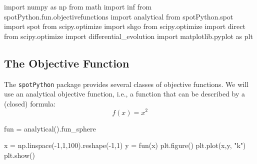 \documentclass[
  letterpaper,
  DIV=11,
  numbers=noendperiod]{scrreprt}
\newenvironment{Shaded}{\begin{snugshade}}{\end{snugshade}}
\newcommand{\DecValTok}[1]{\textcolor[rgb]{0.68,0.00,0.00}{#1}}
\newcommand{\ImportTok}[1]{\textcolor[rgb]{0.00,0.46,0.62}{#1}}
\newcommand{\NormalTok}[1]{\textcolor[rgb]{0.00,0.23,0.31}{#1}}
\newcommand{\OperatorTok}[1]{\textcolor[rgb]{0.37,0.37,0.37}{#1}}
\newcommand{\StringTok}[1]{\textcolor[rgb]{0.13,0.47,0.30}{#1}}
\begin{document}
\begin{Shaded}
\begin{Highlighting}[]
\ImportTok{import}\NormalTok{ numpy }\ImportTok{as}\NormalTok{ np}
\ImportTok{from}\NormalTok{ math }\ImportTok{import}\NormalTok{ inf}
\ImportTok{from}\NormalTok{ spotPython.fun.objectivefunctions }\ImportTok{import}\NormalTok{ analytical}
\ImportTok{from}\NormalTok{ spotPython.spot }\ImportTok{import}\NormalTok{ spot}
\ImportTok{from}\NormalTok{ scipy.optimize }\ImportTok{import}\NormalTok{ shgo}
\ImportTok{from}\NormalTok{ scipy.optimize }\ImportTok{import}\NormalTok{ direct}
\ImportTok{from}\NormalTok{ scipy.optimize }\ImportTok{import}\NormalTok{ differential\_evolution}
\ImportTok{import}\NormalTok{ matplotlib.pyplot }\ImportTok{as}\NormalTok{ plt}
\end{Highlighting}
\end{Shaded}

\hypertarget{the-objective-function}{%
\subsection{The Objective Function}\label{the-objective-function}}

The \texttt{spotPython} package provides several classes of objective
functions. We will use an analytical objective function, i.e., a
function that can be described by a (closed) formula: \[f(x) = x^2\]

\begin{Shaded}
\begin{Highlighting}[]
\NormalTok{fun }\OperatorTok{=}\NormalTok{ analytical().fun\_sphere}
\end{Highlighting}
\end{Shaded}

\begin{Shaded}
\begin{Highlighting}[]
\NormalTok{x }\OperatorTok{=}\NormalTok{ np.linspace(}\OperatorTok{{-}}\DecValTok{1}\NormalTok{,}\DecValTok{1}\NormalTok{,}\DecValTok{100}\NormalTok{).reshape(}\OperatorTok{{-}}\DecValTok{1}\NormalTok{,}\DecValTok{1}\NormalTok{)}
\NormalTok{y }\OperatorTok{=}\NormalTok{ fun(x)}
\NormalTok{plt.figure()}
\NormalTok{plt.plot(x,y, }\StringTok{"k"}\NormalTok{)}
\NormalTok{plt.show()}
\end{Highlighting}
\end{Shaded}
\end{document}
